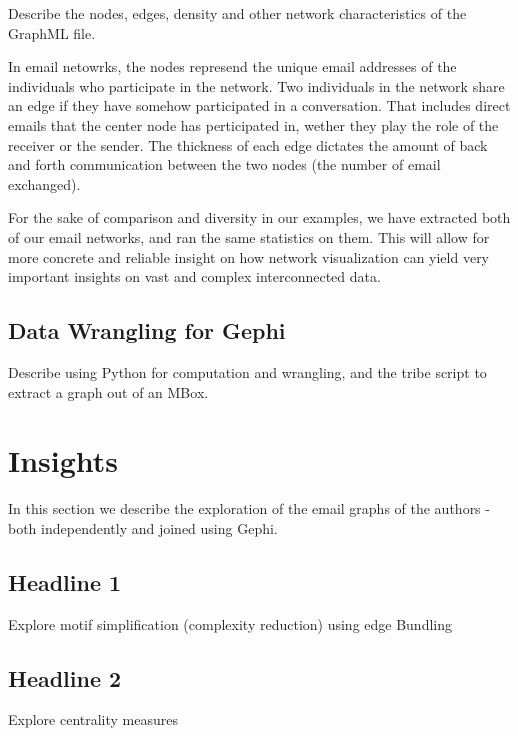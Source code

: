 \documentclass[11pt,letterpaper]{article}
\begin{document}
Describe the nodes, edges, density and other network characteristics of the GraphML file.

In email netowrks, the nodes represend the unique email addresses of the individuals who participate in the network. Two individuals in the network share an edge if they have somehow participated in a conversation. That includes direct emails that the center node has perticipated in, wether they play the role of the receiver or the sender. The thickness of each edge dictates the amount of back and forth communication between the two nodes (the number of email exchanged).

For the sake of comparison and diversity in our examples, we have extracted both of our email networks, and ran the same statistics on them. This will allow for more concrete and reliable insight on how network visualization can yield very important insights on vast and complex interconnected data.

\subsection*{Data Wrangling for Gephi}

Describe using Python for computation and wrangling, and the tribe script to extract a graph out of an MBox.

\section*{Insights}
In this section we describe the exploration of the email graphs of the authors - both independently and joined using Gephi.

\subsection*{Headline 1}

Explore motif simplification (complexity reduction) using edge Bundling


\subsection*{Headline 2}

Explore centrality measures
\end{document}
